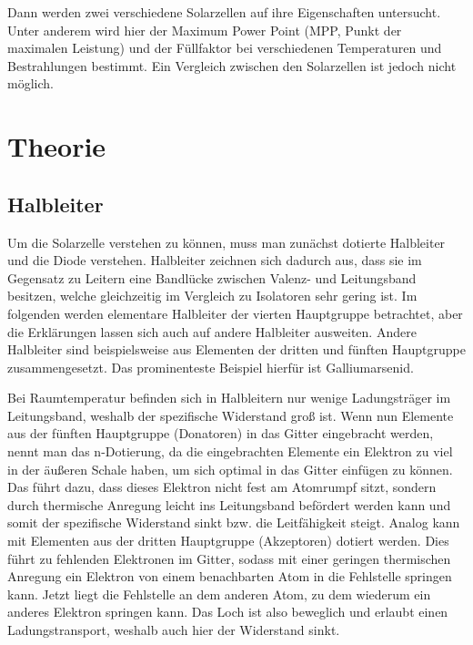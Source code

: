 \documentclass[
	a4paper,
	12pt,
	pagesize,
	ngerman
]{scrartcl}
\begin{document}
	Dann werden zwei verschiedene Solarzellen auf ihre Eigenschaften untersucht.
	Unter anderem wird hier der Maximum Power Point (MPP, Punkt der maximalen Leistung) und der Füllfaktor bei verschiedenen Temperaturen und Bestrahlungen bestimmt.
	Ein Vergleich zwischen den Solarzellen ist jedoch nicht möglich. %

  \section{Theorie}



	\subsection{Halbleiter}
	Um die Solarzelle verstehen zu können, muss man zunächst dotierte Halbleiter und die Diode verstehen.
	Halbleiter zeichnen sich dadurch aus, dass sie im Gegensatz zu Leitern eine Bandlücke zwischen Valenz- und Leitungsband besitzen, welche gleichzeitig im Vergleich zu Isolatoren sehr gering ist.
	Im folgenden werden elementare Halbleiter der vierten Hauptgruppe betrachtet, aber die Erklärungen lassen sich auch auf andere Halbleiter ausweiten.
	Andere Halbleiter sind beispielsweise aus Elementen der dritten und fünften Hauptgruppe zusammengesetzt.
	Das prominenteste Beispiel hierfür ist Galliumarsenid.

	Bei Raumtemperatur befinden sich in Halbleitern nur wenige Ladungsträger im Leitungsband, weshalb der spezifische Widerstand groß ist.
	Wenn nun Elemente aus der fünften Hauptgruppe (Donatoren) in das Gitter eingebracht werden, nennt man das n-Dotierung, da die eingebrachten Elemente ein Elektron zu viel in der äußeren Schale haben, um sich optimal in das Gitter einfügen zu können.
	Das führt dazu, dass dieses Elektron nicht fest am Atomrumpf sitzt, sondern durch thermische Anregung leicht ins Leitungsband befördert werden kann und somit der spezifische Widerstand sinkt bzw. die Leitfähigkeit steigt. %
	Analog kann mit Elementen aus der dritten Hauptgruppe (Akzeptoren) dotiert werden.
	Dies führt zu fehlenden Elektronen im Gitter, sodass mit einer geringen thermischen Anregung ein Elektron von einem benachbarten Atom in die Fehlstelle springen kann.
	Jetzt liegt die Fehlstelle an dem anderen Atom, zu dem wiederum ein anderes Elektron springen kann.
	Das Loch ist also beweglich und erlaubt einen Ladungstransport, weshalb auch hier der Widerstand sinkt.
\end{document}

